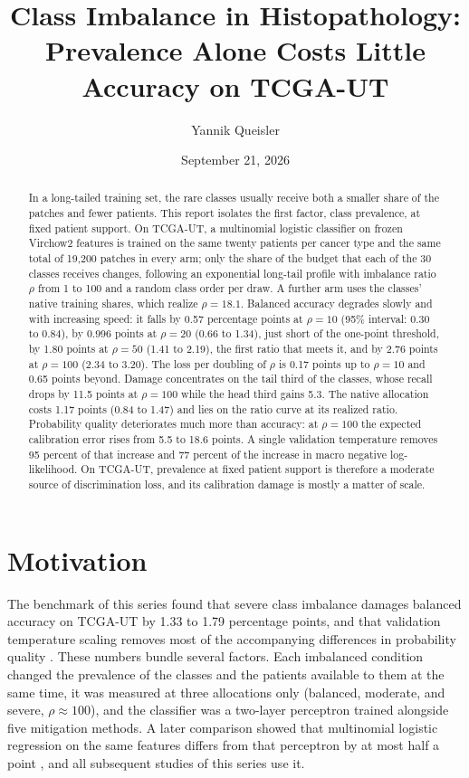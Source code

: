 \documentclass[11pt]{article}
\title{Class Imbalance in Histopathology:\\Prevalence Alone Costs Little Accuracy on TCGA-UT}
\author{Yannik Queisler}
\date{September 21, 2026}
\begin{document}
\raggedbottom
{}
\setlength{\emergencystretch}{2em}
\maketitle
\begin{abstract}
\noindent In a long-tailed training set, the rare classes usually receive both a smaller share of the patches and fewer patients. This report isolates the first factor, class prevalence, at fixed patient support. On TCGA-UT, a multinomial logistic classifier on frozen Virchow2 features is trained on the same twenty patients per cancer type and the same total of 19,200 patches in every arm; only the share of the budget that each of the 30 classes receives changes, following an exponential long-tail profile with imbalance ratio $\rho$ from 1 to 100 and a random class order per draw. A further arm uses the classes' native training shares, which realize $\rho=18.1$. Balanced accuracy degrades slowly and with increasing speed: it falls by 0.57 percentage points at $\rho=10$ (95\% interval: 0.30 to 0.84), by 0.996 points at $\rho=20$ (0.66 to 1.34), just short of the one-point threshold, by 1.80 points at $\rho=50$ (1.41 to 2.19), the first ratio that meets it, and by 2.76 points at $\rho=100$ (2.34 to 3.20). The loss per doubling of $\rho$ is 0.17 points up to $\rho=10$ and 0.65 points beyond. Damage concentrates on the tail third of the classes, whose recall drops by 11.5 points at $\rho=100$ while the head third gains 5.3. The native allocation costs 1.17 points (0.84 to 1.47) and lies on the ratio curve at its realized ratio. Probability quality deteriorates much more than accuracy: at $\rho=100$ the expected calibration error rises from 5.5 to 18.6 points. A single validation temperature removes 95 percent of that increase and 77 percent of the increase in macro negative log-likelihood. On TCGA-UT, prevalence at fixed patient support is therefore a moderate source of discrimination loss, and its calibration damage is mostly a matter of scale.
\end{abstract}

\section{Motivation}
\label{sec:motivation}
The benchmark of this series found that severe class imbalance damages balanced accuracy on TCGA-UT by 1.33 to 1.79 percentage points, and that validation temperature scaling removes most of the accompanying differences in probability quality \citep{queisler2026benchmarkResults,queisler2026benchmarkProtocol}. These numbers bundle several factors. Each imbalanced condition changed the prevalence of the classes and the patients available to them at the same time, it was measured at three allocations only (balanced, moderate, and severe, $\rho\approx100$), and the classifier was a two-layer perceptron trained alongside five mitigation methods. A later comparison showed that multinomial logistic regression on the same features differs from that perceptron by at most half a point \citep{queisler2026patientShortage}, and all subsequent studies of this series use it.
\end{document}

